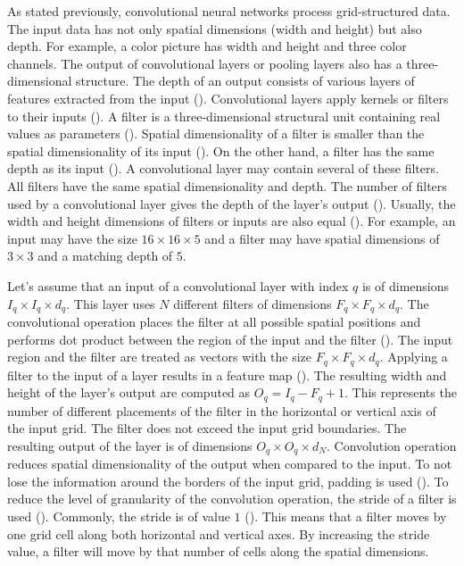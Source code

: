 \documentclass{BachelorBUI}
\begin{document}
                As stated previously, convolutional neural networks process grid-structured data. The input data has not only spatial dimensions (width and height) but also depth. For example, a color picture has width and height and three color channels. The output of convolutional layers or pooling layers also has a three-dimensional structure. The depth of an output consists of various layers of features extracted from the input (\cite{Aggarwal:2018}). Convolutional layers apply kernels or filters to their inputs (\cite{Aggarwal:2018}). A filter is a three-dimensional structural unit containing real values as parameters (\cite{Aggarwal:2018}). Spatial dimensionality of a filter is smaller than the spatial dimensionality of its input (\cite{Aggarwal:2018}). On the other hand, a filter has the same depth as its input (\cite{Aggarwal:2018}). A convolutional layer may contain several of these filters. All filters have the same spatial dimensionality and depth. The number of filters used by a convolutional layer gives the depth of the layer's output (\cite{Aggarwal:2018}). Usually, the width and height dimensions of filters or inputs are also equal (\cite{Aggarwal:2018}). For example, an input may have the size $16 \times 16 \times 5$ and a filter may have spatial dimensions of $3 \times 3$ and a matching depth of $5$. 
                
                Let's assume that an input of a convolutional layer with index $q$ is of dimensions $I_{q} \times I_{q} \times d_q$. This layer uses $N$ different filters of dimensions $F_{q} \times F_{q} \times d_q$. The convolutional operation places the filter at all possible spatial positions and performs dot product between the region of the input and the filter (\cite{Aggarwal:2018}). The input region and the filter are treated as vectors with the size $F_{q} \times F_{q} \times d_q$. Applying a filter to the input of a layer results in a feature map (\cite{Aggarwal:2018}). The resulting width and height of the layer's output are computed as $O_{q} = I_{q} - F_{q} + 1$. This represents the number of different placements of the filter in the horizontal or vertical axis of the input grid. The filter does not exceed the input grid boundaries. The resulting output of the layer is of dimensions $O_{q} \times O_{q} \times d_N$. Convolution operation reduces spatial dimensionality of the output when compared to the input. To not lose the information around the borders of the input grid, padding is used (\cite{Aggarwal:2018}). To reduce the level of granularity of the convolution operation, the stride of a filter is used (\cite{Aggarwal:2018}). Commonly, the stride is of value $1$ (\cite{Aggarwal:2018}). This means that a filter moves by one grid cell along both horizontal and vertical axes. By increasing the stride value, a filter will move by that number of cells along the spatial dimensions.
\end{document}
